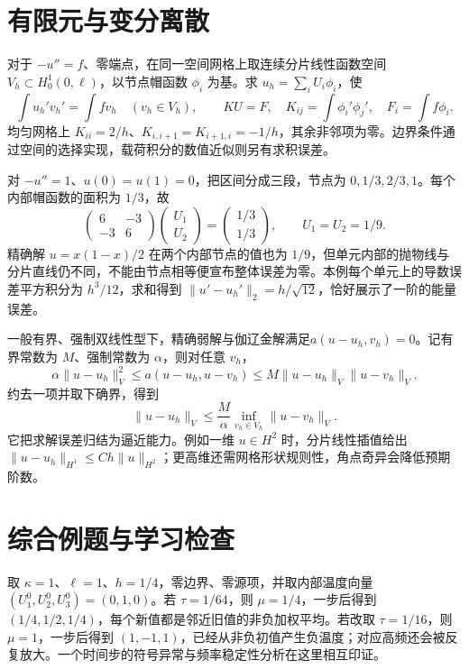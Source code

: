 \documentclass[UTF8,12pt,a4paper,fontset=fandol]{ctexbook}
\begin{document}
\section{有限元与变分离散}
对于 $-u''=f$、零端点，在同一空间网格上取连续分片线性函数空间 $V_h\subset H_0^1(0,\ell)$，以节点帽函数 $\phi_i$ 为基。求 $u_h=\sum_iU_i\phi_i$，使
\[
 \int u_h'v_h'=\int fv_h\quad(v_h\in V_h),\qquad
 KU=F,\quad K_{ij}=\int\phi_i'\phi_j',\quad F_i=\int f\phi_i.
\]
均匀网格上 $K_{ii}=2/h$、$K_{i,i+1}=K_{i+1,i}=-1/h$，其余非邻项为零。边界条件通过空间的选择实现，载荷积分的数值近似则另有求积误差。

\begin{example}[两项未知量的有限元方程]
对 $-u''=1$、$u(0)=u(1)=0$，把区间分成三段，节点为 $0,1/3,2/3,1$。每个内部帽函数的面积为 $1/3$，故
\[
 \begin{pmatrix}6&-3\\-3&6\end{pmatrix}
 \begin{pmatrix}U_1\\U_2\end{pmatrix}
 =\begin{pmatrix}1/3\\1/3\end{pmatrix},
 \qquad U_1=U_2=1/9.
\]
精确解 $u=x(1-x)/2$ 在两个内部节点的值也为 $1/9$，但单元内部的抛物线与分片直线仍不同，不能由节点相等便宣布整体误差为零。本例每个单元上的导数误差平方积分为 $h^3/12$，求和得到 $\|u'-u_h'\|_2=h/\sqrt{12}$，恰好展示了一阶的能量误差。
\end{example}

一般有界、强制双线性型下，精确弱解与伽辽金解满足$a(u-u_h,v_h)=0$。记有界常数为 $M$、强制常数为 $\alpha$，则对任意 $v_h$，
\[
 \alpha\|u-u_h\|_V^2\le a(u-u_h,u-v_h)
 \le M\|u-u_h\|_V\|u-v_h\|_V.
\]
约去一项并取下确界，得到
\begin{equation}
 \|u-u_h\|_V\le\frac M\alpha\inf_{v_h\in V_h}\|u-v_h\|_V.
 \label{eq:cea}
\end{equation}
它把求解误差归结为逼近能力。例如一维 $u\in H^2$ 时，分片线性插值给出 $\|u-u_h\|_{H^1}\le Ch\|u\|_{H^2}$；更高维还需网格形状规则性，角点奇异会降低预期阶数。

\section{综合例题与学习检查}
\begin{example}[手算显式热格式的一步]
取 $\kappa=1$、$\ell=1$、$h=1/4$，零边界、零源项，并取内部温度向量 $(U_1^0,U_2^0,U_3^0)=(0,1,0)$。若 $\tau=1/64$，则 $\mu=1/4$，一步后得到 $(1/4,1/2,1/4)$，每个新值都是邻近旧值的非负加权平均。若改取 $\tau=1/16$，则 $\mu=1$，一步后得到 $(1,-1,1)$，已经从非负初值产生负温度；对应高频还会被反复放大。一个时间步的符号异常与频率稳定性分析在这里相互印证。
\end{example}
\end{document}
